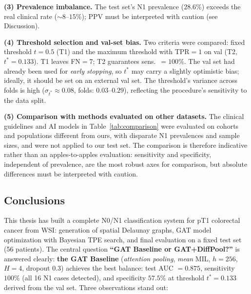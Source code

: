 \documentclass[10pt,a4paper,twocolumn,twoside]{article}
\begin{document}
\textbf{(3) Prevalence imbalance.}
The test set's N1 prevalence ($28.6\%$) exceeds the real clinical rate ($\sim\!8$–$15\%$); PPV
must be interpreted with caution (see Discussion).

\textbf{(4) Threshold selection and val-set bias.}
Two criteria were compared: fixed threshold $t\!=\!0.5$ (T1) and the maximum threshold with TPR$=1$ on val
(T2, $t^*\!=\!0.133$). T1 leaves FN$=7$; T2 guarantees sens.\ $=\!100\%$. The val set had already
been used for \textit{early stopping}, so $t^*$ may carry a
slightly optimistic bias; ideally, it should be set on an external val set. The threshold's
variance across folds is high ($\sigma_{t^*}\!\approx\!0.08$, folds: $0.03$--$0.29$),
reflecting the procedure's sensitivity to the data split.

\textbf{(5) Comparison with methods evaluated on other datasets.}
The clinical guidelines and AI models in Table~\ref{tab:comparison} were evaluated on
cohorts and populations different from ours, with disparate N1 prevalences and sample sizes, and
were not applied to our test set. The comparison is therefore indicative rather than
an apples-to-apples evaluation: sensitivity and specificity, independent of
prevalence, are the most robust axes for comparison, but absolute differences must
be interpreted with caution.

\subsection{Conclusions}

This thesis has built a complete N0/N1 classification system for pT1
colorectal cancer from WSI: generation of spatial Delaunay graphs, GAT model
optimization with Bayesian TPE search, and final evaluation on a fixed test set (56 patients).
The central question \textbf{``GAT Baseline or GAT+DiffPool?''} is answered clearly:
\textbf{the GAT Baseline} (\textit{attention pooling}, \textit{mean} MIL, $h\!=\!256$,
$H\!=\!4$, dropout $0.3$) achieves the best balance: test AUC $=0.875$, sensitivity
$100\%$ (all 16 N1 cases detected), and specificity $57.5\%$ at threshold $t^*\!=\!0.133$
derived from the val set. Three observations stand out:
\end{document}
